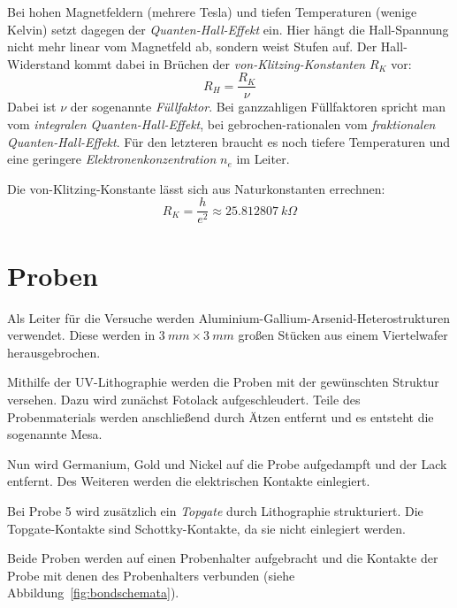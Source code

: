\documentclass[a4paper]{article}
\begin{document}
Bei hohen Magnetfeldern (mehrere Tesla) und
tiefen Temperaturen (wenige Kelvin)
setzt dagegen der \emph{Quanten-Hall-Effekt} ein.
Hier hängt die Hall-Spannung nicht mehr linear vom Magnetfeld ab,
sondern weist Stufen auf.
Der Hall-Widerstand kommt dabei in Brüchen
der \emph{von-Klitzing-Konstanten} $R_K$ vor:
\begin{equation} R_H = \frac{R_K}{\nu} \label{eq:hallwiderstand} \end{equation}
Dabei ist $\nu$ der sogenannte \emph{Füllfaktor}.
Bei ganzzahligen Füllfaktoren spricht man
vom \emph{integralen Quanten-Hall-Effekt},
bei gebrochen-rationalen
vom \emph{fraktionalen Quanten-Hall-Effekt}.
Für den letzteren braucht es noch tiefere Temperaturen
und eine geringere \emph{Elektronenkonzentration} $n_e$ im Leiter.

Die von-Klitzing-Konstante lässt sich aus Naturkonstanten errechnen:
\begin{equation}
R_K = \frac{h}{e^2} \approx \SI{25,812807}{k\Omega}
\end{equation}


\section*{Proben}

Als Leiter für die Versuche werden
Aluminium-Gallium-Arsenid-Heterostrukturen verwendet.
Diese werden in $\SI{3}{mm}\times\SI{3}{mm}$ großen Stücken
aus einem Viertelwafer herausgebrochen.

Mithilfe der UV-Lithographie werden
die Proben mit der gewünschten Struktur versehen.
Dazu wird zunächst Fotolack aufgeschleudert.
Teile des Probenmaterials werden anschließend durch Ätzen entfernt
und es entsteht die sogenannte Mesa.

Nun wird Germanium, Gold und Nickel auf die Probe aufgedampft und
der Lack entfernt.
Des Weiteren werden die elektrischen Kontakte einlegiert.

Bei Probe 5 wird zusätzlich ein \emph{Topgate} durch Lithographie strukturiert.
Die Topgate-Kontakte sind Schottky-Kontakte,
da sie nicht einlegiert werden.

Beide Proben werden auf einen Probenhalter aufgebracht und
die Kontakte der Probe mit denen
des Probenhalters verbunden (siehe Abbildung~\ref{fig:bondschemata}).
\end{document}
